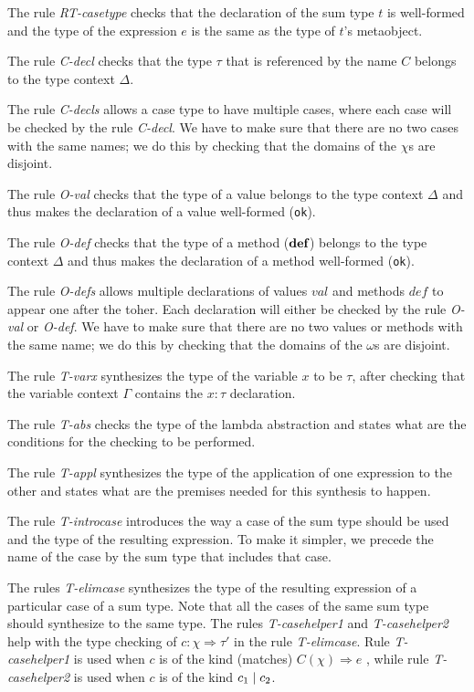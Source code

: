 The rule \textit{RT-casetype} checks that the declaration of the sum type $t$ is well-formed and the type of the expression $e$ is the same as the type of $t$'s metaobject.

The rule \textit{C-decl} checks that the type $\tau$ that is referenced by the name $C$ belongs to the type context $\Delta$.

The rule \textit{C-decls} allows a case type to have multiple cases, where each case will be checked by the rule \textit{C-decl}. We have to make sure that there are no two cases with the same names; we do this by checking that the domains of the $\chi$s are disjoint.

The rule \textit{O-val} checks that the type of a value belongs to the type context $\Delta$ and thus makes the declaration of a value well-formed (\texttt{ok}).

The rule \textit{O-def} checks that the type of a method ($\textbf{def}$) belongs to the type context $\Delta$ and thus makes the declaration of a method well-formed (\texttt{ok}).

The rule \textit{O-defs} allows multiple declarations of values $val$ and methods $def$ to appear one after the toher. Each declaration will either be checked by the rule \textit{O-val} or \textit{O-def}. We have to make sure that there are no two values or methods with the same name; we do this by checking that the domains of the $\omega$s are disjoint.

The rule \textit{T-varx} synthesizes the type of the variable $x$ to be $\tau$, after checking that the variable context $\Gamma$ contains the $x:\tau$ declaration. 

The rule \textit{T-abs} checks the type of the lambda abstraction and states what are the conditions for the checking to be performed.

The rule \textit{T-appl} synthesizes the type of the application of one expression to the other and states what are the premises needed for this synthesis to happen.

The rule \textit{T-introcase} introduces the way a case of the sum type should be used and the type of the resulting expression. To make it simpler, we precede the name of the case by the sum type that includes that case.

The rules \textit{T-elimcase} synthesizes the type of the resulting expression of a particular case of a sum type. Note that all the cases of the same sum type should synthesize to the same type. The rules  \textit{T-casehelper1} and \textit{T-casehelper2} help with the type checking of $c:\chi \Rightarrow \tau'$ in the rule \textit{T-elimcase}. Rule \textit{T-casehelper1} is used when $c$ is of the kind (matches) $C(\chi)\Rightarrow e$ , while rule \textit{T-casehelper2} is used when $c$ is of the kind $c_1 \mathrel{\mid} c_2$.

